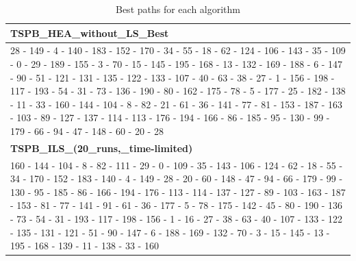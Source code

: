 \begin{table}[h!]
\begin{tabular}{|p{14cm}|}
\textbf{TSPB\_HEA\_without\_LS\_Best} \\ \hline
28 - 149 - 4 - 140 - 183 - 152 - 170 - 34 - 55 - 18 - 62 - 124 - 106 - 143 - 35 - 109 - 0 - 29 - 189 - 155 - 3 - 70 - 15 - 145 - 195 - 168 - 13 - 132 - 169 - 188 - 6 - 147 - 90 - 51 - 121 - 131 - 135 - 122 - 133 - 107 - 40 - 63 - 38 - 27 - 1 - 156 - 198 - 117 - 193 - 54 - 31 - 73 - 136 - 190 - 80 - 162 - 175 - 78 - 5 - 177 - 25 - 182 - 138 - 11 - 33 - 160 - 144 - 104 - 8 - 82 - 21 - 61 - 36 - 141 - 77 - 81 - 153 - 187 - 163 - 103 - 89 - 127 - 137 - 114 - 113 - 176 - 194 - 166 - 86 - 185 - 95 - 130 - 99 - 179 - 66 - 94 - 47 - 148 - 60 - 20 - 28 \\ \hline
\textbf{TSPB\_ILS\_(20\_runs,\_time-limited)} \\ \hline
160 - 144 - 104 - 8 - 82 - 111 - 29 - 0 - 109 - 35 - 143 - 106 - 124 - 62 - 18 - 55 - 34 - 170 - 152 - 183 - 140 - 4 - 149 - 28 - 20 - 60 - 148 - 47 - 94 - 66 - 179 - 99 - 130 - 95 - 185 - 86 - 166 - 194 - 176 - 113 - 114 - 137 - 127 - 89 - 103 - 163 - 187 - 153 - 81 - 77 - 141 - 91 - 61 - 36 - 177 - 5 - 78 - 175 - 142 - 45 - 80 - 190 - 136 - 73 - 54 - 31 - 193 - 117 - 198 - 156 - 1 - 16 - 27 - 38 - 63 - 40 - 107 - 133 - 122 - 135 - 131 - 121 - 51 - 90 - 147 - 6 - 188 - 169 - 132 - 70 - 3 - 15 - 145 - 13 - 195 - 168 - 139 - 11 - 138 - 33 - 160 \\ \hline
\end{tabular}
\caption{Best paths for each algorithm}
\end{table}